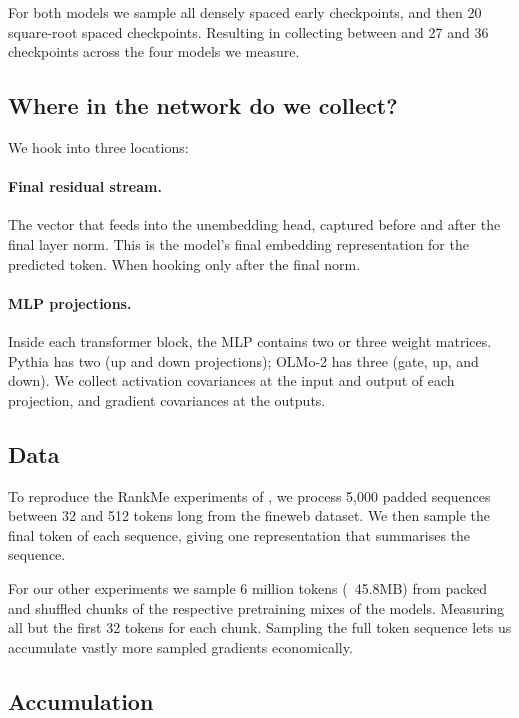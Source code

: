 \documentclass[11pt,a4paper]{article}
\begin{document}
For both models we sample all densely spaced early checkpoints, and then 20 square-root spaced checkpoints. Resulting in collecting between and 27 and 36 checkpoints across the four models we measure.

\subsection{Where in the network do we collect?}

We hook into three locations:

\paragraph{Final residual stream.}
The vector that feeds into the unembedding head, captured before and after the final layer norm.
This is the model's final embedding representation for the predicted token. When hooking only after the final norm.

\paragraph{MLP projections.}
Inside each transformer block, the MLP contains two or three weight matrices.
Pythia has two (up and down projections); OLMo-2 has three (gate, up, and down).
We collect activation covariances at the input and output of each projection, and gradient covariances at the outputs.

\subsection{Data}

To reproduce the RankMe experiments of \citet{li2025tracing}, we process 5,000 padded sequences between 32 and 512 tokens long from the fineweb dataset. We then sample the final token of each sequence, giving one representation that summarises the sequence.

For our other experiments we sample 6 million tokens (~45.8MB) from packed and shuffled chunks of the respective pretraining mixes of the models. Measuring all but the first 32 tokens for each chunk. Sampling the full token sequence lets us accumulate vastly more sampled gradients economically.

\subsection{Accumulation}
\end{document}
